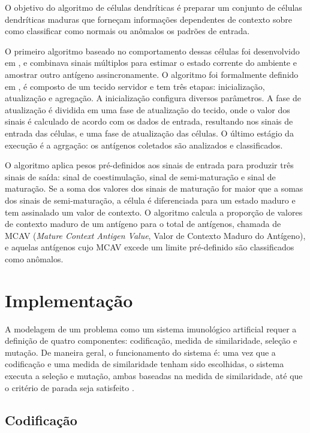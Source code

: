 O objetivo do algoritmo de células dendríticas é preparar um conjunto de células dendríticas maduras que forneçam informações dependentes de contexto sobre como classificar como normais ou anômalos os padrões de entrada.

O primeiro algoritmo baseado no comportamento dessas células foi desenvolvido em \citet{Greensmith2005}, e combinava sinais múltiplos para estimar o estado corrente do ambiente e amostrar outro antígeno assincronamente. O algoritmo foi formalmente definido em \citet{Greensmith2006}, é composto de um tecido servidor e tem três etapas: inicialização, atualização e agregação. A inicialização configura diversos parâmetros. A fase de atualização é dividida em uma fase de atualização do tecido, onde o valor dos sinais é calculado de acordo com os dados de entrada, resultando nos sinais de entrada das células, e uma fase de atualização das células. O último estágio da execução é a agrgação: os antígenos coletados são analizados e classificados.

O algoritmo aplica pesos pré-definidos aos sinais de entrada para produzir três sinais de saída: sinal de coestimulação, sinal de semi-maturação e sinal de maturação. Se a soma dos valores dos sinais de maturação for maior que a somas dos sinais de semi-maturação, a célula é diferenciada para um estado maduro e tem assinalado um valor de contexto. O algoritmo calcula a proporção de valores de contexto maduro de um antígeno para o total de antígenos, chamada de MCAV (\emph{Mature Context Antigen Value}, Valor de Contexto Maduro do Antígeno), e aquelas antígenos cujo MCAV excede um limite pré-definido são classificados como anômalos.

\section{Implementação}

A modelagem de um problema como um sistema imunológico artificial requer a definição de quatro componentes: codificação, medida de similaridade, seleção e mutação. De maneira geral, o funcionamento do sistema é: uma vez que a codificação e uma medida de similaridade tenham sido escolhidas, o sistema executa a seleção e mutação, ambas baseadas na medida de similaridade, até que o critério de parada seja satisfeito \cite{Aickelin2005}.

\subsection{Codificação}

